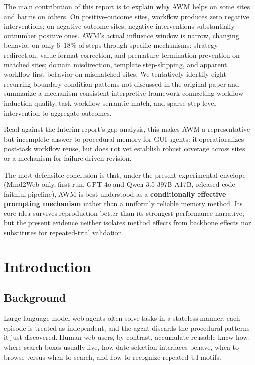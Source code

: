 \documentclass{article}
\begin{document}
The main contribution of this report is to explain \textbf{why} AWM
helps on some sites and harms on others. On positive-outcome sites,
workflow produces zero negative interventions; on negative-outcome
sites, negative interventions substantially outnumber positive ones.
AWM's actual
influence window is narrow, changing behavior on only 6--18\% of steps
through specific mechanisms: strategy redirection, value format
correction, and premature termination prevention on matched sites;
domain misdirection, template step-skipping, and apparent
workflow-first behavior on mismatched sites. We tentatively identify
eight recurring boundary-condition patterns not discussed in the
original paper and summarize a mechanism-consistent interpretive
framework connecting workflow induction quality, task-workflow semantic
match, and sparse step-level intervention to aggregate outcomes.

Read against the Interim report's gap analysis, this makes AWM a
representative but incomplete answer to procedural memory for GUI
agents: it operationalizes post-task workflow reuse, but does not yet
establish robust coverage across sites or a mechanism for failure-driven
revision.

The most defensible conclusion is that, under the present experimental
envelope (Mind2Web only, first-run, GPT-4o and Qwen-3.5-397B-A17B,
released-code-faithful pipeline), AWM is best understood as a
\textbf{conditionally effective prompting mechanism} rather than a
uniformly reliable memory method. Its core idea survives reproduction
better than its strongest performance narrative, but the present
evidence neither isolates method effects from backbone effects nor
substitutes for repeated-trial validation.

\section{Introduction}\label{introduction}

\subsection{Background}\label{background}

Large language model web agents often solve tasks in a stateless manner:
each episode is treated as independent, and the agent discards the
procedural patterns it just discovered. Human web users, by contrast,
accumulate reusable know-how: where search boxes usually live, how date
selection interfaces behave, when to browse versus when to search, and
how to recognize repeated UI motifs.
\end{document}

